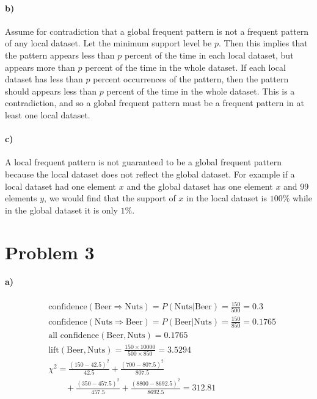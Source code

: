 \documentclass[12pt]{article}
\begin{document}
\paragraph{b)}

Assume for contradiction that a global frequent pattern is not a frequent pattern
of any local dataset. Let the minimum support level be \(p\). Then this implies that the pattern
appears less than \(p\) percent of the time in each local dataset, but appears more than \(p\)
percent of the time in the whole dataset. If each local dataset has less than \(p\) percent
occurrences of the pattern, then the pattern should appears less than \(p\) percent of the time in the whole
dataset. This is a contradiction, and so a global frequent pattern must be a frequent pattern
in at least one local dataset.

\paragraph{c)}

A local frequent pattern is not guaranteed to be a global frequent pattern because the local dataset
does not reflect the global dataset. For example if a local dataset had one element \(x\) and the global
dataset has one element \(x\) and 99 elements \(y\), we would find that the support of \(x\) in the
local dataset is \(100\%\) while in the global dataset it is only \(1\%\).

\section*{Problem 3}

\paragraph{a)}

\begin{align*}
    &\text{confidence}(\text{Beer}\Rightarrow\text{Nuts})=P(\text{Nuts}|\text{Beer})=\frac{150}{500}=0.3\\
    &\text{confidence}(\text{Nuts}\Rightarrow\text{Beer})=P(\text{Beer}|\text{Nuts})=\frac{150}{850}=0.1765\\
    &\text{all confidence}(\text{Beer},\text{Nuts})=0.1765\\
    &\text{lift}(\text{Beer},\text{Nuts})=\frac{150\times10000}{500\times850}=3.5294\\
    &\chi^2=\frac{(150-42.5)^2}{42.5}+\frac{(700-807.5)^2}{807.5}\\
    &\qquad+\frac{(350-457.5)^2}{457.5}+\frac{(8800-8692.5)^2}{8692.5}=312.81
\end{align*}
\end{document}
